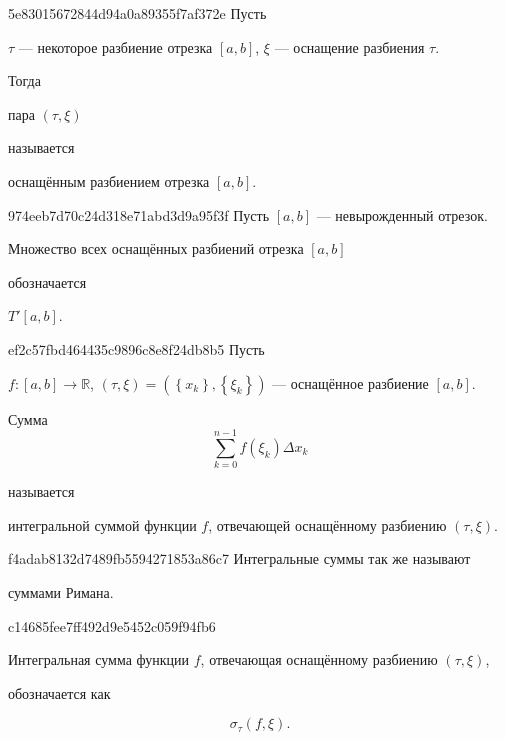 \begin{note}{5e83015672844d94a0a89355f7af372e}
    Пусть \begin{icloze}{3}\( \tau \) --- некоторое разбиение отрезка \( [a, b] \), \( \xi \) --- оснащение разбиения \( \tau \).\end{icloze}
    Тогда \begin{icloze}{1}пара \( (\tau, \xi) \)\end{icloze} называется \begin{icloze}{2}оснащённым разбиением отрезка \( [a, b] \).\end{icloze}
\end{note}

\begin{note}{974eeb7d70c24d318e71abd3d9a95f3f}
    Пусть \({ [a, b] }\) --- невырожденный отрезок.
    \begin{icloze}{1}Множество всех оснащённых разбиений отрезка \({ [a,  b] }\)\end{icloze} обозначается \begin{icloze}{2}\({ T'[a, b] }\).\end{icloze}
\end{note}

\begin{note}{ef2c57fbd464435c9896c8e8f24db8b5}
    Пусть \begin{icloze}{3}\( f : [a, b] \to \mathbb R \), \: \( (\tau, \xi) = \left( \left\{ x_k \right\}, \left\{ \xi_k \right\} \right) \) --- оснащённое разбиение \( [a, b] \).\end{icloze}
    \begin{icloze}{1}Сумма
    \[
        \sum_{k=0}^{n - 1} f(\xi_k) \Delta x_k
    \]\end{icloze}
    называется \begin{icloze}{2}интегральной суммой функции \( f \), отвечающей оснащённому разбиению \( (\tau, \xi) \).\end{icloze}
\end{note}

\begin{note}{f4adab8132d7489fb5594271853a86c7}
    Интегральные суммы так же называют \begin{icloze}{1}суммами Римана.\end{icloze}
\end{note}

\begin{note}{c14685fee7ff492d9e5452c059f94fb6}
    \begin{icloze}{2}Интегральная сумма функции \( f \), отвечающая оснащённому разбиению \( (\tau, \xi) \),\end{icloze} обозначается как
    \begin{icloze}{1}
        \[
            \sigma_\tau (f, \xi).
        \]
    \end{icloze}
\end{note}

